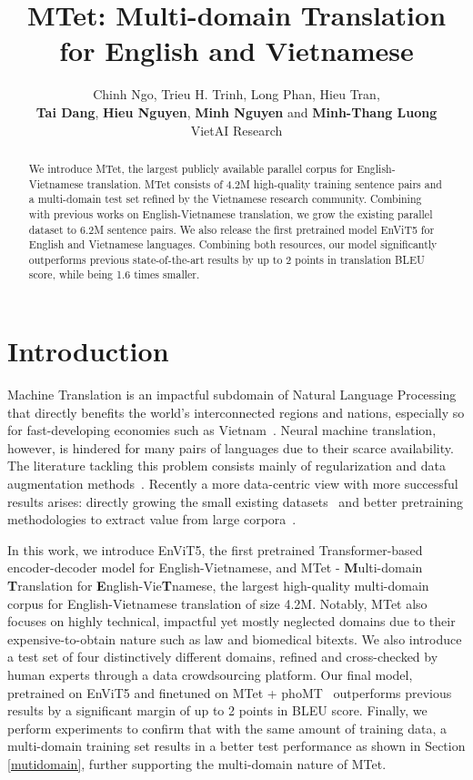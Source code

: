 \documentclass[11pt]{article}
\title{MTet: Multi-domain Translation for English and Vietnamese}
\author{Chinh Ngo, Trieu H. Trinh, Long Phan, Hieu Tran, 
        \\ {\bf Tai Dang}, {\bf Hieu Nguyen}, {\bf Minh Nguyen} and {\bf Minh-Thang Luong}\\
        VietAI Research}
\begin{document}
\maketitle
\def\thefootnote{*}\def\thefootnote{\arabic{footnote}}
\begin{abstract}
We introduce MTet, the largest publicly available parallel corpus for English-Vietnamese translation. MTet consists of 4.2M high-quality training sentence pairs and a multi-domain test set refined by the Vietnamese research community. Combining with previous works on English-Vietnamese translation, we grow the existing parallel dataset to 6.2M sentence pairs. We also release the first pretrained model EnViT5 for English and Vietnamese languages. Combining both resources, our model significantly outperforms previous state-of-the-art results by up to 2 points in translation BLEU score, while being 1.6 times smaller.
\end{abstract}

\section{Introduction}
Machine Translation is an impactful subdomain of Natural Language Processing that directly benefits the world's interconnected regions and nations, especially so for fast-developing economies such as Vietnam~\cite{vietnamworkingpaper}. Neural machine translation, however, is hindered for many pairs of languages due to their scarce availability. The literature tackling this problem consists mainly of regularization and data augmentation methods~\cite{bpedrop,toan19transformers,kevin18semi}. Recently a more data-centric view with more successful results arises: directly growing the small existing datasets~\citep{m2m100,sat2021ngo,cruz2021improving} and better pretraining methodologies to extract value from large corpora~\citep{mbart,lample2019xlm,song2019mass}.

In this work, we introduce EnViT5, the first pretrained Transformer-based encoder-decoder model for English-Vietnamese, and MTet - \textbf{M}ulti-domain \textbf{T}ranslation for \textbf{E}nglish-Vie\textbf{T}namese, the largest high-quality multi-domain corpus for English-Vietnamese translation of size 4.2M. 
Notably, MTet also focuses on highly technical, impactful yet mostly neglected domains due to their expensive-to-obtain nature such as law and biomedical bitexts. We also introduce a test set of four distinctively different domains, refined and cross-checked by human experts through a data crowdsourcing platform. Our final model, pretrained on EnViT5 and finetuned on MTet + phoMT~\cite{doan-etal-2021-phomt} outperforms previous results by a significant margin of up to 2 points in BLEU score. Finally, we perform experiments to confirm that with the same amount of training data, a multi-domain training set results in a better test performance as shown in Section \ref{mutidomain}, further supporting the multi-domain nature of MTet.
\end{document}
